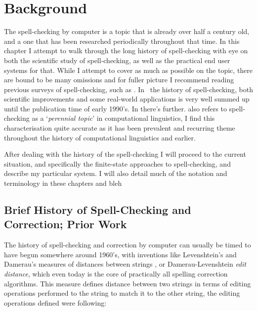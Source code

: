 \documentclass[officiallayout]{unihelcompling}
\begin{document}
\chapter{Background}
\label{chap:background}

The spell-checking by computer is a topic that is already over half a century
old, and a one that has been researched periodically throughout that time.  In
this chapter I attempt to walk through the long history of spell-checking with
eye on both the scientific study of spell-checking, as well as the practical
end user systems for that. While I attempt to cover as much as possible on the
topic, there are bound to be many omissions and for fuller picture I recommend
reading previous surveys of spell-checking, such as
\citep{kukich1992spelling,mitton2009ordering}.  In~\cite{kukich1992spelling} the
history of spell-checking, both scientific improvements and some real-world
applications is very well summed up until the publication time of early 1990's.
In \citep{mitton2009ordering} there's further.
\citep{kukich1992spelling} also refers to spell-checking as a
`\emph{perennial topic}' in computational linguistics, I find this
characterisation quite accurate as it has been prevalent and recurring theme
throughout the history of computational linguistics and earlier.

After dealing with the history of the spell-checking I will proceed to the
current situation, and specifically the finite-state approaches to
spell-checking, and describe my particular system. I will also detail much of
the notation and terminology in these chapters and bleh

\section{Brief History of Spell-Checking and Correction; Prior Work}

The history of spell-checking and correction by computer can usually be timed
to have begun somewhere around 1960's, with inventions like Levenshtein's and
Damerau's measures of distances between strings
\citep{levenshtein1966binary,damerau1964technique}, or Damerau-Levenshtein
\emph{edit distance}, which even today is the core of practically all spelling
correction algorithms. This measure defines distance between two strings in
terms of editing operations performed to the string to match it to the other
string, the editing operations defined were following:
\end{document}
